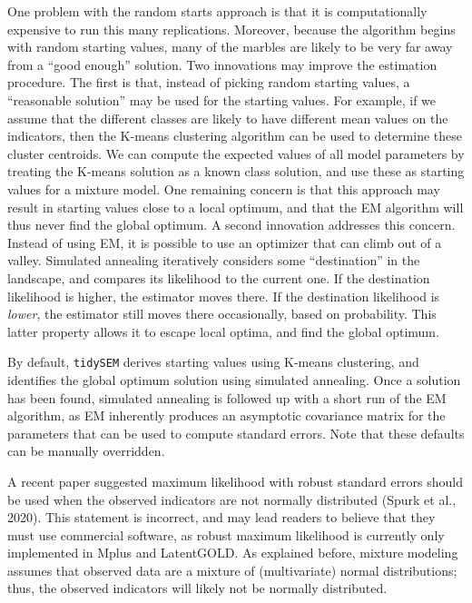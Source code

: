 \documentclass[
  ,man,floatsintext]{apa6}
\begin{document}
One problem with the random starts approach is that it is
computationally expensive to run this many replications. Moreover,
because the algorithm begins with random starting values, many of the
marbles are likely to be very far away from a ``good enough'' solution.
Two innovations may improve the estimation procedure. The first is that,
instead of picking random starting values, a ``reasonable solution'' may
be used for the starting values. For example, if we assume that the
different classes are likely to have different mean values on the
indicators, then the K-means clustering algorithm can be used to
determine these cluster centroids. We can compute the expected values of
all model parameters by treating the K-means solution as a known class
solution, and use these as starting values for a mixture model. One
remaining concern is that this approach may result in starting values
close to a local optimum, and that the EM algorithm will thus never find
the global optimum. A second innovation addresses this concern. Instead
of using EM, it is possible to use an optimizer that can climb out of a
valley. Simulated annealing iteratively considers some ``destination'' in
the landscape, and compares its likelihood to the current one. If the
destination likelihood is higher, the estimator moves there. If the
destination likelihood is \emph{lower}, the estimator still moves there
occasionally, based on probability. This latter property allows it to
escape local optima, and find the global optimum.

By default, \texttt{tidySEM} derives starting values using K-means clustering,
and identifies the global optimum solution using simulated annealing.
Once a solution has been found, simulated annealing is followed up with
a short run of the EM algorithm, as EM inherently produces an asymptotic
covariance matrix for the parameters that can be used to compute
standard errors. Note that these defaults can be manually overridden.

A recent paper suggested maximum likelihood with robust standard errors
should be used when the observed indicators are not normally distributed
(Spurk et al., 2020). This statement is incorrect, and may lead readers
to believe that they must use commercial software, as robust maximum
likelihood is currently only implemented in Mplus and LatentGOLD. As
explained before, mixture modeling assumes that observed data are a
mixture of (multivariate) normal distributions; thus, the observed
indicators will likely not be normally distributed.
\end{document}
